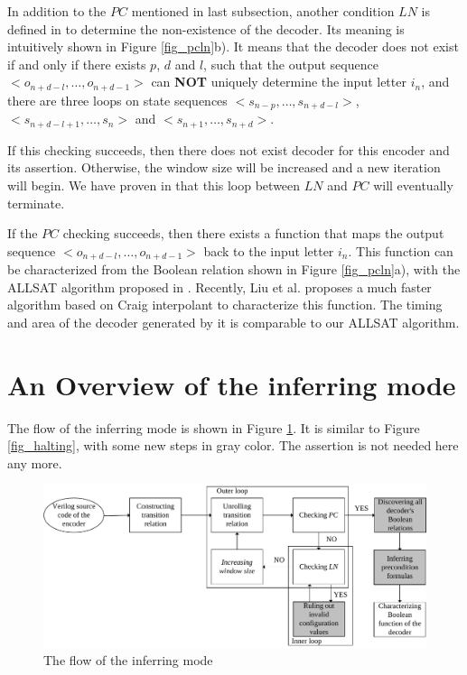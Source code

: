 \documentclass[runningheads,a4paper]{llncs}
\begin{document}
\vspace{0.2cm}
\vspace{0.2cm}

In addition to the $PC$ mentioned in last subsection,
another condition $LN$ is defined in \cite{ShengYuShen:tcad11} to determine the non-existence of the decoder.
Its meaning is intuitively shown in Figure \ref{fig_pcln}b).
It means that the decoder does not exist if and only if there exists $p$, $d$ and $l$,
such that the output sequence $<o_{n+d-l},\dots,o_{n+d-1}>$ can \textbf{NOT} uniquely determine the input letter $i_n$,
and there are three loops on state sequences $<s_{n-p},\dots,s_{n+d-l}>$,$<s_{n+d-l+1},\dots,s_n>$ and $<s_{n+1},\dots,s_{n+d}>$.

If this checking succeeds,
then there does not exist decoder for this encoder and its assertion.
Otherwise,
the window size will be increased and a new iteration will begin.
We have proven in \cite{ShengYuShen:tcad11} that this loop between $LN$ and $PC$ will eventually terminate.

\vspace{0.2cm}
\vspace{0.2cm}

If the $PC$ checking succeeds,
then there exists a function that maps the output sequence $<o_{n+d-l},\dots,o_{n+d-1}>$ back to the input letter $i_n$.
This function can be characterized from the Boolean relation shown in Figure \ref{fig_pcln}a),
with the ALLSAT algorithm proposed in \cite{ShengYuShen:tcad}.
Recently,
Liu et al.\cite{Roland:iccad11} proposes a much faster algorithm based on Craig interpolant\cite{Craig} to characterize this function.
The timing and area of the decoder generated by it is comparable to our ALLSAT algorithm.



\section{An Overview of the inferring mode}\label{sec_infer}
The flow of the inferring mode is shown in Figure \ref{fig_infer}.
It is similar to Figure \ref{fig_halting},
with some new steps in gray color.
The assertion is not needed here any more.

\begin{figure}[t]
\centering
\includegraphics[width=\textwidth]{infer}
\caption{The flow of the inferring mode}
\label{fig_infer}
\end{figure}
\end{document}
